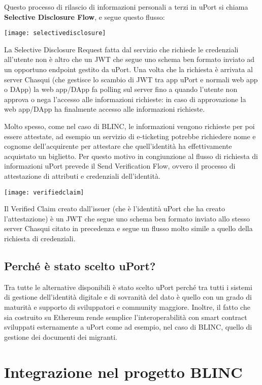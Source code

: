 Questo processo di rilascio di informazioni personali a terzi in uPort si chiama \textbf{Selective Disclosure Flow}, e segue questo flusso:

\texttt{[image: selectivedisclosure]}

La Selective Disclosure Request fatta dal servizio che richiede le credenziali
all’utente non è altro che un JWT che segue uno schema ben formato inviato ad un
opportuno endpoint gestito da uPort. Una volta che la richiesta è arrivata al server
Chasqui (che gestisce lo scambio di JWT tra app uPort e normali web app o DApp)
la web app/DApp fa polling sul server fino a quando l’utente non approva o nega
l’accesso alle informazioni richieste: in caso di approvazione la web app/DApp ha
finalmente accesso alle informazioni richieste.

Molto spesso, come nel caso di BLINC, le informazioni vengono richieste per poi essere
attestate, ad esempio un servizio di e-ticketing potrebbe
richiedere nome e cognome dell’acquirente per attestare che
quell’identità ha effettivamente acquistato un biglietto. Per questo motivo
in congiunzione al flusso di richiesta di informazioni uPort prevede il
Send Verification Flow, ovvero il processo di attestazione di attributi
e credenziali dell’identità.

\texttt{[image: verifiedclaim]}

Il Verified Claim creato dall’issuer (che è l’identità uPort che ha creato l’attestazione)
è un JWT che segue uno schema ben formato inviato allo stesso server Chasqui citato
in precedenza e segue un flusso molto simile a quello della richiesta di credenziali.

\subsection{Perché è stato scelto uPort?}
Tra tutte le alternative disponibili è stato scelto uPort perché tra tutti i sistemi
di gestione dell’identità digitale e di sovranità del dato è quello con un grado di
maturità e supporto di sviluppatori e community maggiore. 
Inoltre, il fatto che sia costruito su Ethereum rende semplice l’interoperabilità
con smart contract sviluppati esternamente a uPort come ad esempio, nel caso di BLINC,
quello di gestione dei documenti dei migranti.

\section{Integrazione nel progetto BLINC}

